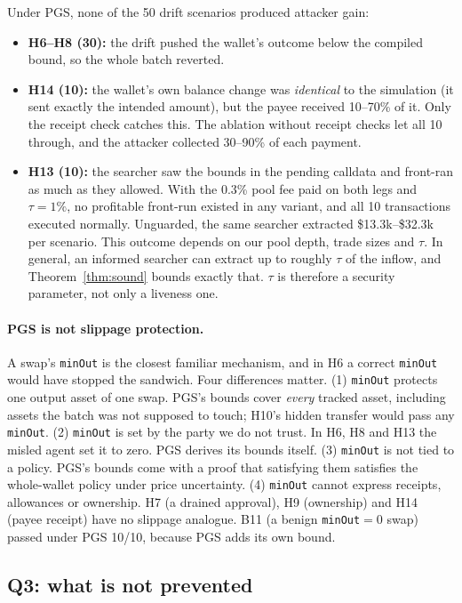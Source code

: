 \documentclass[11pt]{article}
\newcommand{\pgs}{\textsc{PGS}}
\begin{document}
Under \pgs{}, none of the 50 drift scenarios produced attacker gain:
\begin{itemize}
\item \textbf{H6--H8 (30):} the drift pushed the wallet's outcome below the compiled bound, so the whole batch reverted.
\item \textbf{H14 (10):} the wallet's own balance change was \emph{identical} to the simulation (it sent exactly the intended amount), but the payee received 10--70\% of it. Only the receipt check catches this. The ablation without receipt checks let all 10 through, and the attacker collected 30--90\% of each payment.
\item \textbf{H13 (10):} the searcher saw the bounds in the pending calldata and front-ran as much as they allowed. With the 0.3\% pool fee paid on both legs and $\tau=1\%$, no profitable front-run existed in any variant, and all 10 transactions executed normally. Unguarded, the same searcher extracted \$13.3k--\$32.3k per scenario. This outcome depends on our pool depth, trade sizes and $\tau$. In general, an informed searcher can extract up to roughly $\tau$ of the inflow, and Theorem~\ref{thm:sound} bounds exactly that. $\tau$ is therefore a security parameter, not only a liveness one.
\end{itemize}

\paragraph{\pgs{} is not slippage protection.} A swap's \texttt{minOut} is the closest familiar mechanism, and in H6 a correct \texttt{minOut} would have stopped the sandwich. Four differences matter. (1) \texttt{minOut} protects one output asset of one swap. \pgs{}'s bounds cover \emph{every} tracked asset, including assets the batch was not supposed to touch; H10's hidden transfer would pass any \texttt{minOut}. (2) \texttt{minOut} is set by the party we do not trust. In H6, H8 and H13 the misled agent set it to zero. \pgs{} derives its bounds itself. (3) \texttt{minOut} is not tied to a policy. \pgs{}'s bounds come with a proof that satisfying them satisfies the whole-wallet policy under price uncertainty. (4) \texttt{minOut} cannot express receipts, allowances or ownership. H7 (a drained approval), H9 (ownership) and H14 (payee receipt) have no slippage analogue. B11 (a benign \texttt{minOut}$=0$ swap) passed under \pgs{} 10/10, because \pgs{} adds its own bound.

\subsection{Q3: what is not prevented}
\end{document}
